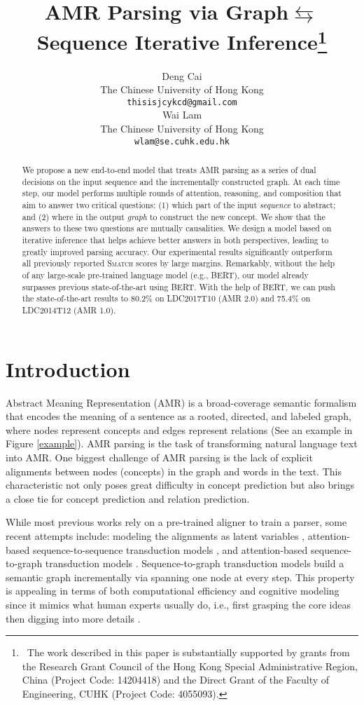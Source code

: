 \documentclass[11pt,a4paper]{article}
\title{AMR Parsing via Graph{\small $\leftrightarrows$}Sequence Iterative Inference\thanks{~The work described in this paper is substantially supported by grants from the Research Grant Council of the Hong Kong Special Administrative Region, China (Project Code: 14204418) and the Direct Grant of the Faculty of Engineering, CUHK (Project Code: 4055093).}}
\author{Deng Cai \\
	The Chinese University of Hong Kong\\
	{\tt thisisjcykcd@gmail.com} \\\And
	Wai Lam \\
	The Chinese University of Hong Kong\\
	{\tt wlam@se.cuhk.edu.hk} \\}
\date{}
\begin{document}
	\maketitle
	\begin{abstract}
		We propose a new end-to-end model that treats AMR parsing as a series of dual decisions on the input sequence and the incrementally constructed graph. At each time step, our model performs multiple rounds of attention, reasoning, and composition that aim to answer two critical questions: (1) which part of the input \textit{sequence} to abstract; and (2) where in the output \textit{graph} to construct the new concept. We show that the answers to these two questions are mutually causalities. We design a model based on iterative inference that helps achieve better answers in both perspectives, leading to greatly improved parsing accuracy. Our experimental results significantly outperform all previously reported \textsc{Smatch} scores by large margins. Remarkably, without the help of any large-scale pre-trained language model (e.g., BERT), our model already surpasses previous state-of-the-art using BERT. With the help of BERT, we can push the state-of-the-art results to 80.2\% on LDC2017T10 (AMR 2.0) and 75.4\% on LDC2014T12 (AMR 1.0).
	\end{abstract}
	\section{Introduction}
	Abstract Meaning Representation (AMR) \cite{banarescu2013abstract} is a broad-coverage semantic formalism that encodes the meaning of a sentence as a rooted, directed, and labeled graph, where nodes represent concepts and edges represent relations (See an example in Figure \ref{example}). AMR parsing is the task of transforming natural language text into AMR. One biggest challenge of AMR parsing is the lack of explicit alignments between nodes (concepts) in the graph and words in the text. This characteristic not only poses great difficulty in concept prediction but also brings a close tie for concept prediction and relation prediction.
	
	While most previous works rely on a pre-trained aligner to train a parser, some recent attempts include: modeling the alignments as latent variables \cite{lyu2018amr}, attention-based sequence-to-sequence transduction models \cite{barzdins2016riga,konstas2017neural,van2017neural}, and attention-based sequence-to-graph transduction models \cite{cai-lam-2019-core,zhang-etal-2019-broad}. Sequence-to-graph transduction models build a semantic graph incrementally via spanning one node at every step. This property is appealing in terms of both computational efficiency and cognitive modeling since it mimics what human experts usually do, i.e., first grasping the core ideas then digging into more details \cite{banarescu2013abstract,cai-lam-2019-core}.
	
\end{document}

